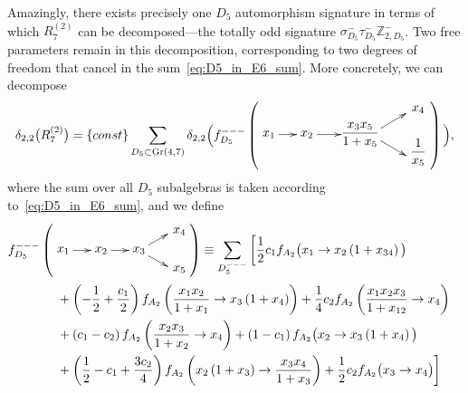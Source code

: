 \documentclass[12pt]{article}
\DeclareMathOperator{\Gr}{Gr}
\def\nl{\nonumber\\}
\begin{document}
Amazingly, there exists precisely one $D_5$ automorphism signature in terms of which $R_7^{(2)}$ can be decomposed---the totally odd signature $\sigma_{D_5}^- \tau_{D_5}^- \mathbb{Z}_{2,D_5}^-$. Two free parameters remain in this decomposition, corresponding to two degrees of freedom that cancel in the sum~\eqref{eq:D5_in_E6_sum}. More concretely, we can decompose 
\begin{align}
\delta_{2,2}\big(R^{(2)}_7 \big) = \{const\} \sum_{D_5\subset \Gr(4,7)} \delta_{2,2} \Big( f_{D_5}^{---}\left(
\begin{gathered}
    \begin{xy} 0;<1pt,0pt>:<0pt,-1pt>::
      (0,20) *+{x_1} ="1",
      (30,20) *+{x_2} ="2",
      (80,20) *+{\color{white} xxxxxxx} ="3",
      (114,0) *+{\color{white} x} ="4",
      (114,40) *+{\color{white} x} ="5",
      (72,20) *+{\begin{aligned} \frac{x_3 x_5}{1+x_5} \end{aligned}} ="6",
      (118,0) *+{x_4} ="7",
      (118,34) *+{\begin{aligned} \frac{1}{x_5}\end{aligned}} ="8",
      "1", {\ar"2"},
      "2", {\ar"3"},
      "3", {\ar"4"},
      "3", {\ar"5"},
    \end{xy}
\end{gathered}
\right) \Big), \label{eq:R27_D5_decomposition}
\end{align}
where the sum over all $D_5$ subalgebras is taken according to~\eqref{eq:D5_in_E6_sum}, and we define
\begin{align}\label{eq:fd5-init}
f_{D_5}^{---}\left(
\begin{gathered}
    \begin{xy} 0;<1pt,0pt>:<0pt,-1pt>::
      (0,15) *+{x_1} ="1",
      (30,15) *+{x_2} ="2",
      (60,15) *+{x_3} ="3",
      (90,-2) *+{\color{white} x_i} ="4",
      (90,32) *+{\color{white} x_i} ="5",
      (92,0) *+{x_4} ="6",
      (92,30) *+{x_5} ="7",
      "1", {\ar"2"},
      "2", {\ar"3"},
      "3", {\ar"4"},
      "3", {\ar"5"},
    \end{xy}
    \end{gathered} 
\right) &\equiv \sum_{D_5^{---}} \bigg[
	\frac{1}{2} c_1 f_{A_2}\big(x_1\to x_2 \left(1+x_{34}\right)\big)\nl
	&\hspace{-4cm} + \left(-\frac{1}{2}+\frac{c_1}{2}\right) f_{A_2}\left(\frac{x_1 x_2}{1+x_1}\to x_3 \left(1+x_4\right)\right)+
	\frac{1}{4} c_2 f_{A_2}\left(\frac{x_1 x_2 x_3}{1+x_{12}}\to x_4\right)\nl
	&\hspace{-4cm}+ \left(c_1-c_2\right) f_{A_2}\left(\frac{x_2 x_3}{1+x_2}\to x_4\right)+
	\left(1-c_1\right) f_{A_2}\big(x_2\to x_3 \left(1+x_4\right)\big) \\
	&\hspace{-4cm}+ \left(\frac{1}{2}-c_1+\frac{3 c_2}{4}\right) f_{A_2}\left(x_2 \left(1+x_3\right)\to \frac{x_3 x_4}{1+x_3}\right) +
	\frac{1}{2} c_2 f_{A_2}\big(x_3\to x_4\big) \bigg] \nonumber
\end{align}
\end{document}
